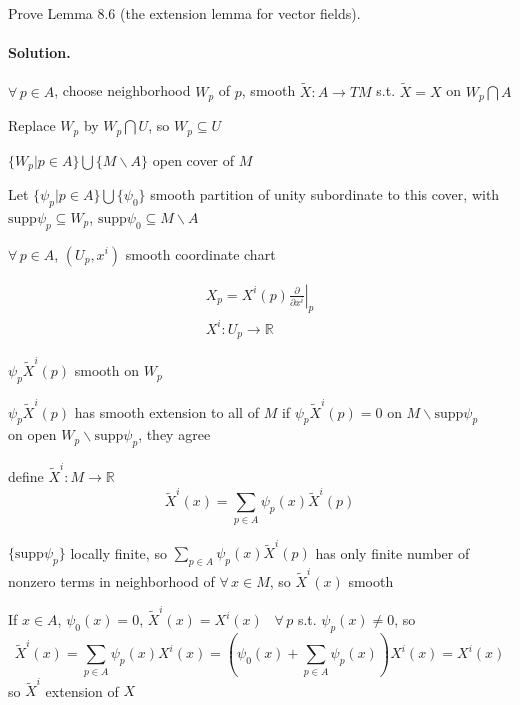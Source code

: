 \begin{exercise}
Prove Lemma 8.6 (the extension lemma for vector fields).
\end{exercise}
\paragraph{Solution.}

$\forall \, p \in A$, choose neighborhood $W_p$ of $p$, smooth $\widetilde{X}:A \to TM$ s.t. $\widetilde{X} = X$ on $W_p \bigcap A$

Replace $W_p$ by $W_p \bigcap U$, so $W_p \subseteq U$

$\lbrace W_p | p \in A \rbrace \bigcup \lbrace M \backslash A \rbrace$ open cover of $M$

Let $\lbrace \psi_p | p \in A \rbrace \bigcup \lbrace \psi_0 \rbrace$ smooth partition of unity subordinate to this cover, with $\text{supp}{\psi_p} \subseteq W_p$, $\text{supp}{\psi_0} \subseteq M \backslash A$

$\forall \, p \in A$, $(U_p,x^i)$ smooth coordinate chart

\[
\begin{gathered}
  X_p = \left. X^i(p) \frac{ \partial }{ \partial x^i } \right|_p \\ 
  X^i: U_p \to \mathbb{R}
\end{gathered}
\]

$\psi_p \widetilde{X}^i(p)$ smooth on $W_p$

$\psi_p\widetilde{X}^i(p)$ has smooth extension to all of $M$ if $\psi_p \widetilde{X}^i(p) =0$ on $M\backslash \text{supp}{\psi_p}$ \\

on open $W_p \backslash \text{supp}{ \psi_p}$, they agree

define $\widetilde{X}^i:M \to \mathbb{R}$ 
\[
\widetilde{X}^i(x) = \sum_{p \in A} \psi_p(x) \widetilde{X}^i(p)
\]

$\lbrace \text{supp}{\psi_p} \rbrace$ locally finite, so $\sum_{p\in A} \psi_p(x) \widetilde{X}^i(p)$ has only finite number of nonzero terms in neighborhood of $\forall \, x \in M$, so $\widetilde{X}^i(x)$ smooth

If $x\in A$, $\psi_0(x) = 0$, $\widetilde{X}^i(x) = X^i(x)$ \quad \, $\forall \, p $ s.t. $\psi_p(x) \neq 0$, so 
\[
\widetilde{X}^i(x) = \sum_{p\in A} \psi_p(x) X^i(x) = (\psi_0(x) + \sum_{p\in A} \psi_p(x)) X^i(x) = X^i(x)
\]
so $\widetilde{X}^i$ extension of $X$


